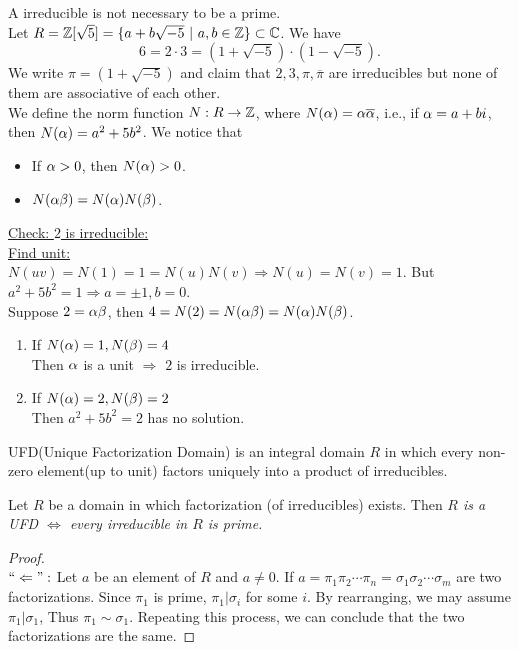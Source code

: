 \documentclass{mynotes}
\begin{document}
\begin{remark}
A irreducible is not necessary to be a prime.\\
Let $R = \Z[\sqrt{5}] = \{a+b\sqrt{-5}\ |\ a,b\in\Z\}\subset \C$. We have $$6=2\cdot3 = (1+\sqrt{-5})\cdot(1-\sqrt{-5}).$$We write $\pi = (1+\sqrt{-5})$ and claim that $2,3,\pi,\overline{\pi}$ are irreducibles but none of them are associative of each other.\\
We define the norm function $N:R\rightarrow \mathbb{Z}$, where $N(\alpha)=\alpha\overline{\alpha}$, i.e., if $\alpha = a+bi$, then $N(\alpha)=a^2+5b^2$. We notice that 
\begin{itemize}
\item If $\alpha>0$, then $N(\alpha)>0$.
\item $N(\alpha\beta)=N(\alpha)N(\beta)$.
\end{itemize}
\underline{Check: $2$ is irreducible:}\\
\underline{Find unit:} \\$N(uv) = N(1) = 1 = N(u)N(v) \Rightarrow N(u)=N(v) = 1$. But $a^2+5b^2 = 1\Rightarrow a=\pm1, b=0$.\\Suppose $2=\alpha\beta$, then $4=N(2) = N(\alpha\beta) = N(\alpha)N(\beta)$.
\begin{enumerate}
\item If $N(\alpha) = 1, N(\beta) = 4$\\
Then $\alpha$ is a unit $\Rightarrow$ $2$ is irreducible.
\item If $N(\alpha) = 2, N(\beta) = 2$\\
Then $a^2+5b^2 = 2$ has no solution.
\end{enumerate}
\end{remark}
\begin{definition}
UFD(Unique Factorization Domain) is an integral domain $R$ in which every non-zero element(up to unit) factors uniquely into a product of irreducibles.
\end{definition}
\begin{proposition}
Let $R$ be a domain in which factorization (of irreducibles) exists. Then \emph{$R$ is a UFD $\Leftrightarrow$ every irreducible in $R$ is prime.}
\end{proposition}
\begin{proof}\mbox{}\\
$``\Leftarrow":$ Let $a$ be an element of $R$ and $a\ne0$. If $a=\pi_1\pi_2\cdots\pi_n=\sigma_1\sigma_2\cdots\sigma_m$ are two factorizations. Since $\pi_1$ is prime, $\pi_1|\sigma_i$ for some $i$. By rearranging, we may assume $\pi_1|\sigma_1$, Thus $\pi_1\sim \sigma_1$. Repeating this process, we can conclude that the two factorizations are the same.
\notcomplete
\end{proof}
\end{document}
